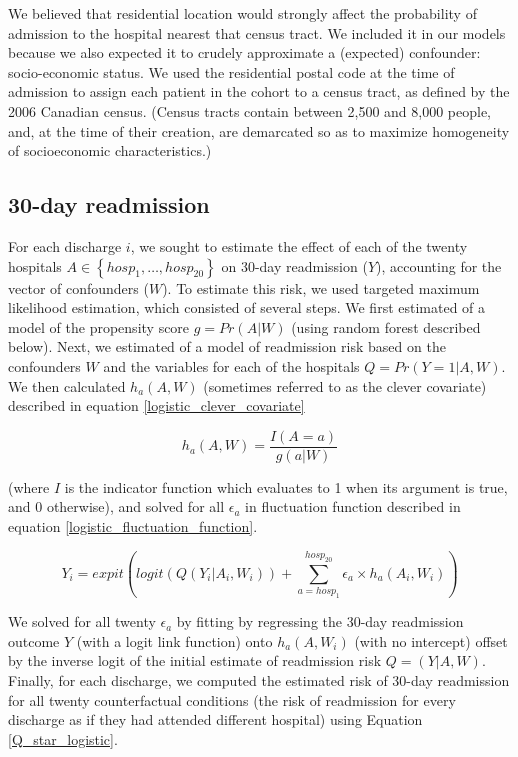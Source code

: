 \documentclass[]{article}\usepackage[]{graphicx}\usepackage[]{color}
\begin{document}
We believed that residential location would strongly affect the probability of admission to the hospital nearest that census tract. We included it in our models because we also expected it to crudely approximate a (expected) confounder: socio-economic status.  We used the residential postal code at the time of admission to assign each patient in the cohort to a census tract, as defined by the 2006 Canadian census. (Census tracts contain between 2,500 and 8,000 people, and, at the time of their creation, are demarcated so as to maximize homogeneity of socioeconomic characteristics.)

\subsection{30-day readmission}
For each discharge $i$, we sought to estimate the effect of each of the twenty hospitals $A \in \left\{ {hosp_1, \dots ,hosp_{20}}\right\}$ on 30-day readmission ($Y$), accounting for the vector of confounders ($W$). To estimate this risk, we used targeted maximum likelihood estimation, which consisted of several steps. We first estimated of a model of the propensity score $g=Pr(A|W)$ (using random forest described below). Next, we estimated of a model of readmission risk based on the confounders $W$ and the variables for each of the hospitals $Q=Pr(Y=1|A,W)$. We then calculated $h_a(A,W)$ (sometimes referred to as the clever covariate) described in equation \ref{logistic_clever_covariate}

\begin{equation}
\label{logistic_clever_covariate}
h_a(A,W)=\frac{I(A=a)}{g(a|W)}
\end{equation}

(where $I$ is the indicator function which evaluates to 1 when its argument is true, and 0 otherwise), and solved for all ${\epsilon}_a$ in fluctuation function described in equation \ref{logistic_fluctuation_function}.

\begin{equation}
\label{logistic_fluctuation_function}
Y_i=expit(logit(Q(Y_i|A_i,W_i)) + \sum_{a=hosp_1}^{hosp_{20}} {\epsilon}_a \times h_a(A_i,W_i))
\end{equation}

We solved for all twenty ${\epsilon}_a$ by fitting by regressing the 30-day readmission outcome $Y$ (with a logit link function) onto $h_a(A,W_i)$ (with no intercept) offset by the inverse logit of the initial estimate of readmission risk $Q=(Y|A,W)$. Finally, for each discharge, we computed the estimated risk of 30-day readmission for all twenty counterfactual conditions (the risk of readmission for every discharge as if they had attended different hospital) using Equation \ref{Q_star_logistic}.
\end{document}
